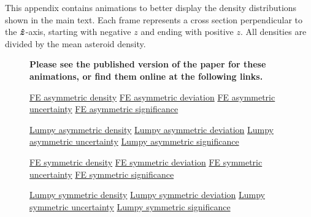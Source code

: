 This appendix contains animations to better display the density distributions shown in the main text. Each frame represents a cross section perpendicular to the $\bm{\hat{z}}$-axis, starting with negative $z$ and ending with positive $z$. All densities are divided by the mean asteroid density.

\begin{figure*}
  \textbf{Please see the published version of the paper for these animations, or find them online at the following links.}

  \href{https://github.com/jack-dinsmore/asteroid-tidal-torque/tree/main/paper/gifs/asym-fe-d.mp4}{FE asymmetric density} \hfill
  \href{https://github.com/jack-dinsmore/asteroid-tidal-torque/tree/main/paper/gifs/asym-fe-s.mp4}{FE asymmetric deviation} \hfill
  \href{https://github.com/jack-dinsmore/asteroid-tidal-torque/tree/main/paper/gifs/asym-fe-u.mp4}{FE asymmetric uncertainty} \hfill
  \href{https://github.com/jack-dinsmore/asteroid-tidal-torque/tree/main/paper/gifs/asym-fe-r.mp4}{FE asymmetric significance}

  \href{https://github.com/jack-dinsmore/asteroid-tidal-torque/tree/main/paper/gifs/asym-l-d.mp4}{Lumpy asymmetric density} \hfill
  \href{https://github.com/jack-dinsmore/asteroid-tidal-torque/tree/main/paper/gifs/asym-l-s.mp4}{Lumpy asymmetric deviation} \hfill
  \href{https://github.com/jack-dinsmore/asteroid-tidal-torque/tree/main/paper/gifs/asym-l-u.mp4}{Lumpy asymmetric uncertainty} \hfill
  \href{https://github.com/jack-dinsmore/asteroid-tidal-torque/tree/main/paper/gifs/asym-l-r.mp4}{Lumpy asymmetric significance}

  \href{https://github.com/jack-dinsmore/asteroid-tidal-torque/tree/main/paper/gifs/sym-fe-d.mp4}{FE symmetric density} \hfill
  \href{https://github.com/jack-dinsmore/asteroid-tidal-torque/tree/main/paper/gifs/sym-fe-s.mp4}{FE symmetric deviation} \hfill
  \href{https://github.com/jack-dinsmore/asteroid-tidal-torque/tree/main/paper/gifs/sym-fe-u.mp4}{FE symmetric uncertainty} \hfill
  \href{https://github.com/jack-dinsmore/asteroid-tidal-torque/tree/main/paper/gifs/sym-fe-r.mp4}{FE symmetric significance}

  \href{https://github.com/jack-dinsmore/asteroid-tidal-torque/tree/main/paper/gifs/sym-l-d.mp4}{Lumpy symmetric density} \hfill
  \href{https://github.com/jack-dinsmore/asteroid-tidal-torque/tree/main/paper/gifs/sym-l-s.mp4}{Lumpy symmetric deviation} \hfill
  \href{https://github.com/jack-dinsmore/asteroid-tidal-torque/tree/main/paper/gifs/sym-l-u.mp4}{Lumpy symmetric uncertainty} \hfill
  \href{https://github.com/jack-dinsmore/asteroid-tidal-torque/tree/main/paper/gifs/sym-l-r.mp4}{Lumpy symmetric significance}


\end{figure*}
